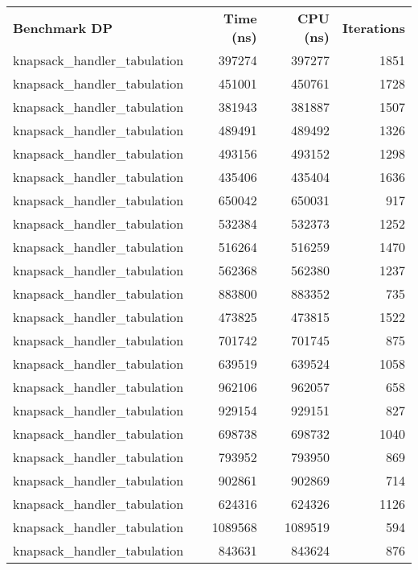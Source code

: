 \documentclass[runningheads]{llncs}
\begin{document}
\begin{table}[h]
    \centering
    \begin{tabular}{@{}lrrr@{}}
        \textbf{Benchmark DP} & \textbf{Time (ns)} & \textbf{CPU (ns)} & \textbf{Iterations} \\
        knapsack\_handler\_tabulation & 397274 & 397277 & 1851 \\
        knapsack\_handler\_tabulation & 451001 & 450761 & 1728 \\
        knapsack\_handler\_tabulation & 381943 & 381887 & 1507 \\
        knapsack\_handler\_tabulation & 489491 & 489492 & 1326 \\
        knapsack\_handler\_tabulation & 493156 & 493152 & 1298 \\
        knapsack\_handler\_tabulation & 435406 & 435404 & 1636 \\
        knapsack\_handler\_tabulation & 650042 & 650031 & 917 \\
        knapsack\_handler\_tabulation & 532384 & 532373 & 1252 \\
        knapsack\_handler\_tabulation & 516264 & 516259 & 1470 \\
        knapsack\_handler\_tabulation & 562368 & 562380 & 1237 \\
        knapsack\_handler\_tabulation & 883800 & 883352 & 735 \\
        knapsack\_handler\_tabulation & 473825 & 473815 & 1522 \\
        knapsack\_handler\_tabulation & 701742 & 701745 & 875 \\
        knapsack\_handler\_tabulation & 639519 & 639524 & 1058 \\
        knapsack\_handler\_tabulation & 962106 & 962057 & 658 \\
        knapsack\_handler\_tabulation & 929154 & 929151 & 827 \\
        knapsack\_handler\_tabulation & 698738 & 698732 & 1040 \\
        knapsack\_handler\_tabulation & 793952 & 793950 & 869 \\
        knapsack\_handler\_tabulation & 902861 & 902869 & 714 \\
        knapsack\_handler\_tabulation & 624316 & 624326 & 1126 \\
        knapsack\_handler\_tabulation & 1089568 & 1089519 & 594 \\
        knapsack\_handler\_tabulation & 843631 & 843624 & 876 \\

\end{tabular}
\end{table}
\end{document}

